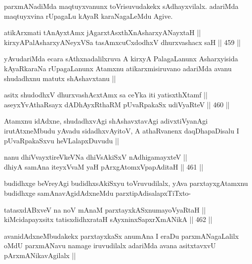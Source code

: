 \begin{artha}
parxmANadiMda maqtuyxvanunx toVrisuvudakekx sAdhayxvilalx. adariMda maqtuyxvina rUpagaLu kAyaR karaNagaLeMdu Agive.
\end{artha}

\begin{shl}
atikArxmati tAnAyxtAmx jAgarxtAsxthXnAsharxyANayxtaH || \\
kirxyAPalAsharxyANeyxVSa tasAmxcuCxdodhxV dhurxvashacx saH ||  459 ||  
\end{shl}

\begin{artha}
yAvudariMda ecara sAthxnadalilxruva A kirxyA PalagaLanunx Asharxyisida kAyaRkaraNa rUpagaLanunx Atamxnu atikarxmisiruvano adariMda avanu shudadhxnu matutx shAshavxtanu ||
\end{artha}

\begin{shl}
asitx shudodhxV dhurxvashAcx\s \s tAmx sa ceYka iti yatisxthXtamf || \\
aseyxYvAthaRsayx dADhAyxRthaRM pUvaRpakaSx udiVyaRteV ||  460 ||  
\end{shl}

\begin{artha}
Atamxnu idAdxne, shudadhxvAgi shAshavxtavAgi adivxtiVyanAgi irutAtxneMbudu yAvadu sidadhxvAyitoV, A athaRvanenx daqDhapaDisalu I pUvaRpakaSxvu heVLalapxDuvudu ||
\end{artha}


\begin{shl}
nanu dhiVvayxtireVkeVNa dhiVsAkiSxV nAdhigamayxteV ||  \\
dhiyA samAna iteyxVvaM yaH pArxgAtomxVpapAditaH ||  461 ||  
\end{shl}

\begin{artha}
budidhxge beVreyAgi budidhxsAkiSxyu toVruvudilalx, yAva parxtayxgAtamxnu budidhxge samAnavAgidAdxneMdu parxtipAdisalapxTiTxto- 
\end{artha}

\begin{shl}
tatasxdABxveV na noV mAnaM parxtayxkASxnumayoVyaRtaH ||  \\
kiMcidapayxsitx tatisxdidhxrataH sAyxninxSapxrXmANikA ||  462 ||  
\end{shl}

\begin{artha}
avanidAdxneMbudakekx parxtayxkaSx anumAna I eraDu parxmANagaLalilx oMdU parxmANavu namage iruvudilalx adariMda avana asitxtavxvU pArxmANikavAgilalx ||
\end{artha}


